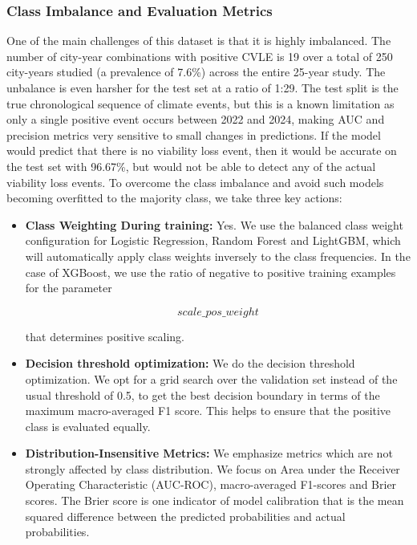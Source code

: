 \documentclass{ieeeaccess}
\begin{document}
\subsubsection{Class Imbalance and Evaluation Metrics}

One of the main challenges of this dataset is that it is highly imbalanced. The number of city-year combinations with positive CVLE is 19 over a total of 250 city-years studied (a prevalence of 7.6\%) across the entire 25-year study. The unbalance is even harsher for the test set at a ratio of 1:29. The test split is the true chronological sequence of climate events, but this is a known limitation as only a single positive event occurs between 2022 and 2024, making AUC and precision metrics very sensitive to small changes in predictions. If the model would predict that there is no viability loss event, then it would be accurate on the test set with 96.67\%, but would not be able to detect any of the actual viability loss events. To overcome the class imbalance and avoid such models becoming overfitted to the majority class, we take three key actions:

\begin{itemize}

\item \textbf{Class Weighting During training:} Yes. We use the balanced class weight configuration for Logistic Regression, Random Forest and LightGBM, which will automatically apply class weights inversely to the class frequencies. In the case of XGBoost, we use the ratio of negative to positive training examples for the parameter

\[
scale\_pos\_weight
\]

that determines positive scaling.

\item \textbf{Decision threshold optimization:} We do the decision threshold optimization. We opt for a grid search over the validation set instead of the usual threshold of 0.5, to get the best decision boundary in terms of the maximum macro-averaged F1 score. This helps to ensure that the positive class is evaluated equally.

\item \textbf{Distribution-Insensitive Metrics:} We emphasize metrics which are not strongly affected by class distribution. We focus on Area under the Receiver Operating Characteristic (AUC-ROC), macro-averaged F1-scores and Brier scores. The Brier score is one indicator of model calibration that is the mean squared difference between the predicted probabilities and actual probabilities.

\end{itemize}
\end{document}
